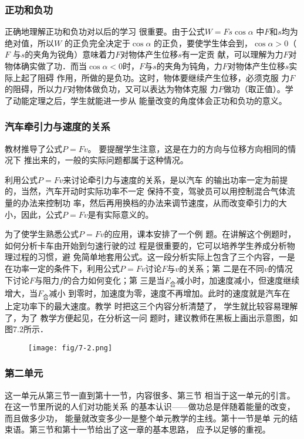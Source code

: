 \subsubsection{正功和负功}

正确地理解正功和负功对以后的学习
很重要。由于公式$W=Fs\cos\alpha$ 中$F$和$s$均为绝对值，所以$W$
的正负完全决定于$\cos\alpha$ 的正负，要使学生体会到，$\cos\alpha >0$（$F$
与$s$的夹角为锐角）意味着力$F$对物体产生位移$s$有一定贡
献，可以理解为力$F$对物体确实做了功．而当$\cos\alpha <0$时，$F
$与$s$的夹角为钝角，力$F$对物体产生位移$s$实际上起了阻碍
作用，所做的是负功。这时，物体要继续产生位移，必须克服
力$F$的阻碍，所以力$F$对物体做负功，又可以表达为物体克服
力$F$做功（取正值）。学了动能定理之后，学生就能进一步从
能量改变的角度体会正功和负功的意义。

\subsubsection{汽车牵引力与速度的关系}

教材推导了公式$P=Fv$。
要提醒学生注意，这是在力的方向与位移方向相同的情况下
推出来的，一般的实际问题都属于这种情况。

利用公式$P=Fv$来讨论牵引力与速度的关系，是以汽车
的输出功率一定为前提的，当然，汽车开动时实际功率不一定
保持不变，驾驶员可以用控制混合气体流量的办法来控制功
率，然后再用换档的办法来调节速度，从而改变牵引力的大
小，因此，公式$P=Fv$是有实际意义的。

为了使学生熟悉公式$P=Fv$的应用，课本安排了一个例
题。在讲解这个例题时，如何分析卡车由开始到匀速行驶的过
程是很重要的，它可以培养学生养成分析物理过程的习惯，避
免简单地套用公式。这一段分析实际上包含了三个内容，一是
在功率一定的条件下，利用公式$P=Fv$讨论$F$与$v$的关系；第
二是在不同$v$的情况下讨论$F$与阻力$f$的合力如何变化；第
三是当$F_{\text{合}}$减小时，加速度减小，但速度继续增大，当$F_{\text{合}}$减小
到零时，加速度为零，速度不再增加。此时的速度就是汽车在
上定功率下的最大速度。教学
时把这三个内容分析清楚了，
学生就比较容易理解了，为了
教学方便起见，在分析这一问
题时，建议教师在黑板上画出示意图，如图7.2所示．
\begin{figure}[htp]
    \centering
    \texttt{[image: fig/7-2.png]}
    \caption{}
\end{figure}


\subsubsection{第二单元}
这一单元从第三节一直到第十一节，内容很多、第三节
相当于这一单元的引言。在这一节里所说的人们对功能关系
的基本认识——做功总是伴随着能量的改变，而且做多少功，
能量就改变多少一是整个单元教学的主线。第十一节是单
元的结束语。第三节和第十一节给出了这一章的基本思路，
应予以足够的重视。

